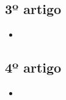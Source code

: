 \documentclass[a4paper]{article}
\begin{document}
\subsection{3º artigo}

\cite{Korf1993}

\begin{itemize}

\item

\end{itemize}

\subsection{4º artigo}

\cite{Dillenburg1994}

\begin{itemize}

\item

\end{itemize}





\end{document}
